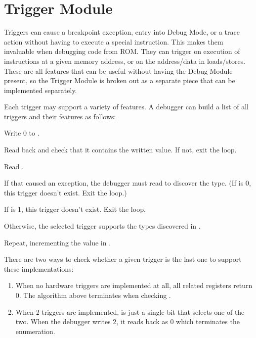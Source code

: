 \chapter{Trigger Module}
\label{sec:trigger}

Triggers can cause a breakpoint exception, entry into Debug Mode, or a trace action
without having to execute a special instruction. This makes them invaluable
when debugging code from ROM. They can trigger on execution of instructions at
a given memory address, or on the address/data in loads/stores.  These are all
features that can be useful without having the Debug Module present, so the
Trigger Module is broken out as a separate piece that can be implemented
separately.

\begin{steps}{Each trigger may support a variety of features. A debugger can
    build a list of all triggers and their features as follows:}
\item Write 0 to \Rtselect.
\item Read back \Rtselect and check that it contains the written value. If not,
    exit the loop.
\item Read \Rtinfo.
\item If that caused an exception, the debugger must read \Rtdataone to
    discover the type. (If \Ftype is 0, this trigger doesn't exist. Exit the
    loop.)
\item If \Finfo is 1, this trigger doesn't exist. Exit the loop.
\item Otherwise, the selected trigger supports the types discovered in \Finfo.
\item Repeat, incrementing the value in \Rtselect.
\end{steps}

\begin{commentary}
    There are two ways to check whether a given trigger is the last one to
    support these implementations:
    \begin{enumerate}
        \item When no hardware triggers are implemented at all, all related
            registers return 0. The algorithm above terminates when checking
            \Ftype.
        \item When 2 triggers are implemented, \Rtselect is just a single bit
            that selects one of the two. When the debugger writes 2, it reads
            back as 0 which terminates the enumeration.
    \end{enumerate}
\end{commentary}

